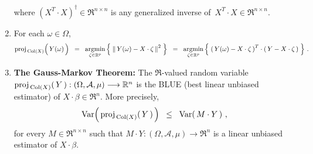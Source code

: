 \begin{theorem}
\begin{enumerate}
\begin{equation*}
	\end{equation*}
	where $(X^{T}\cdot X)^{\dagger} \in \Re^{n \times n}$ is any generalized inverse of
	\,$X^{T} \cdot X \in \Re^{n \times n}$.
\item
	For each $\omega \in \Omega$,
	\begin{equation*}
	\proj_{\,\Col(X)}\!\left(\,\overset{{\color{white}.}}{Y}(\omega)\,\right)
	\;\; = \;\;
		\underset{\zeta \in \Re^{p}}{\argmin}\left\{\;
			\left\Vert\,Y(\omega) - X\cdot\zeta\,\right\Vert^{2}
			\;\right\}
	\;\; = \;\;
		\underset{\zeta \in \Re^{p}}{\argmin}\left\{\;
			\left(\,Y(\omega) - X\cdot\zeta\,\right)^{T} \cdot \left(\,Y - X\cdot\zeta\,\right)
			\;\right\}\,.
	\end{equation*}
\item
	\textbf{The Gauss-Markov Theorem:}\quad %
	The $\Re$-valued random variable
	$\textnormal{proj}_{\,\textnormal{Col}(X)}\!\left(\,Y\,\right) : (\Omega,\mathcal{A},\mu) \longrightarrow \mathbb{R}^{n}$
	is the BLUE (best linear unbiased estimator) of $X \cdot \beta \in \Re^{n}$.
	More precisely,
	\begin{equation*}
	\textnormal{Var}\!\left(\,\textnormal{proj}_{\,\textnormal{Col}(X)}\!\left(\,Y\,\right)\,\right)
	\;\; \leq \;\;
		\textnormal{Var}\!\left(\,M \cdot Y\,\right)\,,
	\end{equation*}
	for every $M \in \Re^{n \times n}$ such that
	$M \cdot Y : (\Omega,\mathcal{A},\mu) \longrightarrow \Re^{n}$
	is a linear unbiased estimator of $X \cdot \beta$.
\end{enumerate}
\end{theorem}



